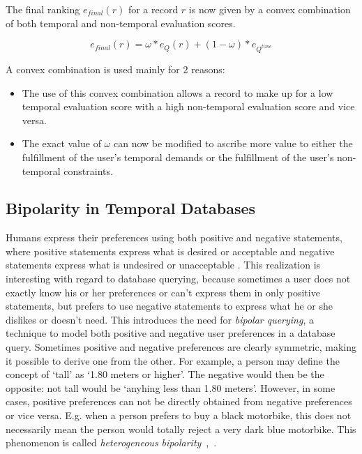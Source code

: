 The final ranking $e_{final}(r)$ for a record $r$ is now given by a convex combination of both temporal and non-temporal evaluation scores.

\begin{equation}
\label{eq:convex-combination}
e_{final} \left( r \right) = \omega \ast e_{Q} \left( r \right) + \left( 1- \omega \right) \ast e_{Q^{time}}
\end{equation}

A convex combination is used mainly for 2 reasons:
\begin{itemize}
	\item The use of this convex combination allows a record to make up for a low temporal evaluation score with a high non-temporal evaluation score and vice versa.
	\item The exact value of $\omega$ can now be modified to ascribe more value to either the fulfillment of the user's temporal demands or the fulfillment of the user's non-temporal constraints.
\end{itemize}

\subsection{Bipolarity in Temporal Databases}
\label{subsubsec:bipolarity}
Humans express their preferences using both positive and negative statements, where positive statements express what is desired or acceptable and negative statements express what is undesired or unacceptable \cite{Billiet:Pons:Matthe:DeTre:Pons:2011:BipolarFuzzy}. This realization is interesting with regard to database querying, because sometimes a user does not exactly know his or her preferences or can't express them in only positive statements, but prefers to use negative statements to express what he or she dislikes or doesn't need. This introduces the need for \emph{bipolar querying}, a technique to model both positive and negative user preferences in a database query. Sometimes positive and negative preferences are clearly symmetric, making it possible to derive one from the other. For example, a person may define the concept of `tall' as `1.80 meters or higher'. The negative would then be the opposite: not tall would be `anyhing less than 1.80 meters'. However, in some cases, positive preferences can not be directly obtained from negative preferences or vice versa. E.g. when a person prefers to buy a black motorbike, this does not necessarily mean the person would totally reject a very dark blue motorbike. This phenomenon is called \emph{heterogeneous bipolarity}~\cite{Dubois2006},~\cite{Dubois2008}.

